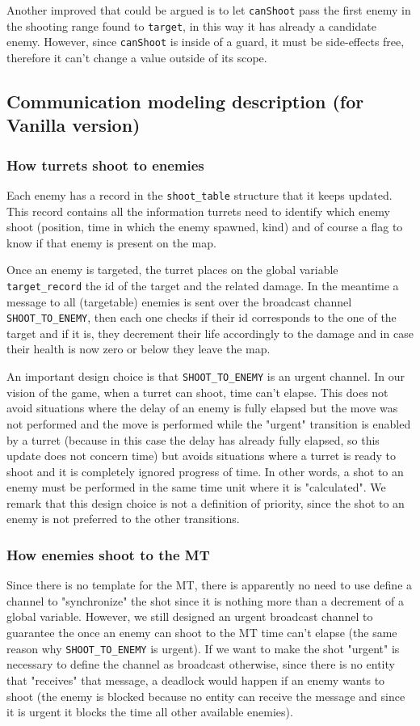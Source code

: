\documentclass[
10pt, %
a4paper, %
oneside, %
headinclude,footinclude, %
BCOR5mm, %
]{scrartcl}
\begin{document}
				Another improved that could be argued is to let \texttt{canShoot} pass the first enemy in the shooting range found to \texttt{target}, in this way it has already a candidate enemy. However, since \texttt{canShoot} is inside of a guard, it must be side-effects free, therefore it can't change a value outside of its scope.
		\subsection{Communication modeling description (for Vanilla version)}
			\subsubsection{How turrets shoot to enemies}
				Each enemy has a record in the \texttt{shoot\_table} structure that it keeps updated. This record contains all the information turrets need to identify which enemy shoot (position, time in which the enemy spawned, kind) and of course a flag to know if that enemy is present on the map.
				
				Once an enemy is targeted, the turret places on the global variable \texttt{target\_record} the id of the target and the related damage. In the meantime a message to all (targetable) enemies is sent over the broadcast channel \texttt{SHOOT\_TO\_ENEMY}, then each one checks if their id corresponds to the one of the target and if it is, they decrement their life accordingly to the damage and in case their health is now zero or below they leave the map.
				
				An important design choice is that \texttt{SHOOT\_TO\_ENEMY} is an urgent channel. In our vision of the game, when a turret can shoot, time can't elapse. This does not avoid situations where the delay of an enemy is fully elapsed but the move was not performed and the move is performed while the "urgent" transition is enabled by a turret (because in this case the delay has already fully elapsed, so this update does not concern time) but avoids situations where a turret is ready to shoot and it is completely ignored progress of time. In other words, a shot to an enemy must be performed in the same time unit where it is "calculated". We remark that this design choice is not a definition of priority, since the shot to an enemy is not preferred to the other transitions.
			\subsubsection{How enemies shoot to the MT}
				Since there is no template for the MT, there is apparently no need to use define a channel to "synchronize" the shot since it is nothing more than a decrement of a global variable. However, we still designed an urgent broadcast channel to guarantee the once an enemy can shoot to the MT time can't elapse (the same reason why \texttt{SHOOT\_TO\_ENEMY} is urgent). If we want to make the shot "urgent" is necessary to define the channel as broadcast otherwise, since there is no entity that "receives" that message, a deadlock would happen if an enemy wants to shoot (the enemy is blocked because no entity can receive the message and since it is urgent it blocks the time all other available enemies).
\end{document}
